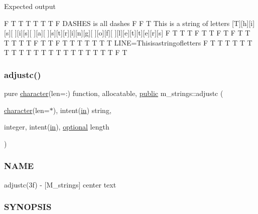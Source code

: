 Expected output

F T T T T T T F D\+A\+S\+H\+ES is all dashes F F T This is a string of letters \mbox{[}T\mbox{]}\mbox{[}h\mbox{]}\mbox{[}i\mbox{]}\mbox{[}s\mbox{]}\mbox{[} \mbox{]}\mbox{[}i\mbox{]}\mbox{[}s\mbox{]}\mbox{[} \mbox{]}\mbox{[}a\mbox{]}\mbox{[} \mbox{]}\mbox{[}s\mbox{]}\mbox{[}t\mbox{]}\mbox{[}r\mbox{]}\mbox{[}i\mbox{]}\mbox{[}n\mbox{]}\mbox{[}g\mbox{]}\mbox{[} \mbox{]}\mbox{[}o\mbox{]}\mbox{[}f\mbox{]}\mbox{[} \mbox{]}\mbox{[}l\mbox{]}\mbox{[}e\mbox{]}\mbox{[}t\mbox{]}\mbox{[}t\mbox{]}\mbox{[}e\mbox{]}\mbox{[}r\mbox{]}\mbox{[}s\mbox{]} F T T T F T T F T F T T T T T T F T T F T T T T T T T L\+I\+NE=Thisisastringofletters F T T T T T T T T T T T T T T T T T T T T T F T \mbox{\label{namespacem__strings_a1cacb2e45c7e3d7ed4cc1b183c35f323}} 
\subsubsection{\texorpdfstring{adjustc()}{adjustc()}}
{\footnotesize\ttfamily pure \hyperlink{option__stopwatch_83_8txt_abd4b21fbbd175834027b5224bfe97e66}{character}(len=\+:) function, allocatable, \hyperlink{M__stopwatch_83_8txt_a2f74811300c361e53b430611a7d1769f}{public} m\+\_\+strings\+::adjustc (\begin{DoxyParamCaption}\item[{\hyperlink{option__stopwatch_83_8txt_abd4b21fbbd175834027b5224bfe97e66}{character}(len=$\ast$), intent(\hyperlink{M__journal_83_8txt_afce72651d1eed785a2132bee863b2f38}{in})}]{string,  }\item[{integer, intent(\hyperlink{M__journal_83_8txt_afce72651d1eed785a2132bee863b2f38}{in}), \hyperlink{option__stopwatch_83_8txt_aa4ece75e7acf58a4843f70fe18c3ade5}{optional}}]{length }\end{DoxyParamCaption})}



\subsubsection*{N\+A\+ME}

adjustc(3f) -\/ \mbox{[}M\+\_\+strings\mbox{]} center text 

\subsubsection*{S\+Y\+N\+O\+P\+S\+IS}

